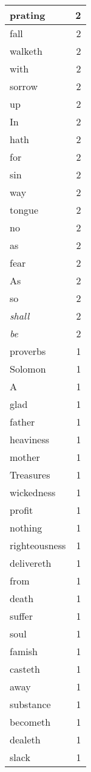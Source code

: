 \begin{center}
\begin{longtable}{l|r}
prating & 2\\ \hline 
fall & 2\\ \hline 
walketh & 2\\ \hline 
with & 2\\ \hline 
sorrow & 2\\ \hline 
up & 2\\ \hline 
In & 2\\ \hline 
hath & 2\\ \hline 
for & 2\\ \hline 
sin & 2\\ \hline 
way & 2\\ \hline 
tongue & 2\\ \hline 
no & 2\\ \hline 
as & 2\\ \hline 
fear & 2\\ \hline 
As & 2\\ \hline 
so & 2\\ \hline 
\emph{shall} & 2\\ \hline 
\emph{be} & 2\\ \hline 
proverbs & 1\\ \hline 
Solomon & 1\\ \hline 
A & 1\\ \hline 
glad & 1\\ \hline 
father & 1\\ \hline 
heaviness & 1\\ \hline 
mother & 1\\ \hline 
Treasures & 1\\ \hline 
wickedness & 1\\ \hline 
profit & 1\\ \hline 
nothing & 1\\ \hline 
righteousness & 1\\ \hline 
delivereth & 1\\ \hline 
from & 1\\ \hline 
death & 1\\ \hline 
suffer & 1\\ \hline 
soul & 1\\ \hline 
famish & 1\\ \hline 
casteth & 1\\ \hline 
away & 1\\ \hline 
substance & 1\\ \hline 
becometh & 1\\ \hline 
dealeth & 1\\ \hline 
slack & 1\\ \hline 

\end{longtable}
\end{center}

